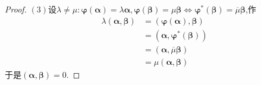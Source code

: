 {\begin{proof}
        $(3)$设$\lambda\neq\mu:\bm{\varphi}\left(\bm{\alpha}\right)=\lambda\bm{\alpha},\bm{\varphi}\left(\bm{\beta}\right)=\mu\bm{\beta}\Longleftrightarrow\bm{\varphi}^*\left(\bm{\beta}\right)=\overline{\mu}\bm{\beta}$,作\begin{align*}
            \lambda\left(
            \bm{\alpha},\bm{\beta}
            \right) & =\left(
            \bm{\varphi}\left(\bm{\alpha}\right),\bm{\beta}
            \right)              \\
                    & =\left(
            \bm{\alpha},\bm{\varphi}^*\left(\bm{\beta}\right)
            \right)              \\
                    & =\left(
            \bm{\alpha},\overline{\mu}\bm{\beta}
            \right)              \\
                    & =\mu\left(
            \bm{\alpha},\bm{\beta}
            \right)
        \end{align*}于是$\left(
            \bm{\alpha},\bm{\beta}
            \right)=0.$
    \end{proof}
}
